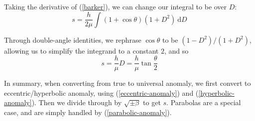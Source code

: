 \documentclass{article}
\newcommand{\dd}{\mathrm{d}}
\numberwithin{equation}{subsection}
\begin{document}
Taking the derivative of (\ref{barker}), we can change our integral to be over $D$:
\begin{equation}
s = \frac{h}{2 \mu} \int (1 + \cos \theta)(1 + D^2)~\dd D
\end{equation}

Through double-angle identities, we rephrase $\cos \theta$ to be $(1 - D^2)/(1 + D^2)$, allowing us to simplify the integrand to a constant $2$, and so
\begin{equation}
\label{parabolic-anomaly}
s = \frac{h}{\mu} D = \frac{h}{\mu} \tan \frac{\theta}{2}
\end{equation}

In summary, when converting from true to universal anomaly, we first convert to eccentric/hyperbolic anomaly, using (\ref{eccentric-anomaly}) and (\ref{hyperbolic-anomaly}). Then we divide through by $\sqrt{\pm \beta}$ to get $s$. Parabolas are a special case, and are simply handled by (\ref{parabolic-anomaly}).
\end{document}
